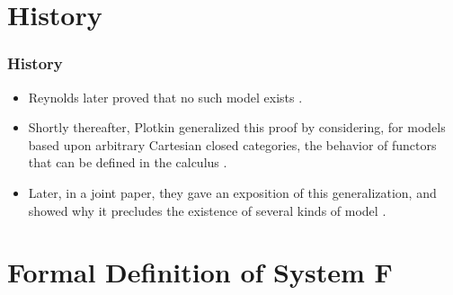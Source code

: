 \section{History}

\begin{frame}[fragile]
    \frametitle{History}
  
    \begin{itemize}
        \item Reynolds later proved that no such model exists \cite{reynold-not-set-theoretic}.
        \item Shortly thereafter, Plotkin generalized this proof by considering, for models based upon arbitrary Cartesian closed categories, the behavior of functors that can be defined in the calculus \cite{plotkin-non-existing-article}.
        \item Later, in a joint paper, they gave an exposition of this generalization, and showed why it precludes the existence of several kinds of model \cite{REYNOLDS19931}.
    \end{itemize}
\end{frame}

\section{Formal Definition of System F}

